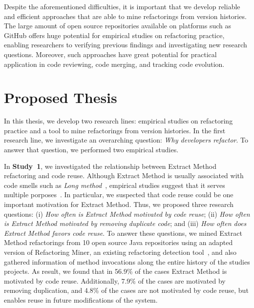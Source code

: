 Despite the aforementioned difficulties, it is important that we develop reliable and efficient approaches that are able to mine refactorings from version histories.
The large amount of open source repositories available on platforms such as GitHub offers huge potential for empirical studies on refactoring practice, enabling researchers to verifying previous findings and investigating new research questions.
Moreover, such approaches have great potential for practical application in code reviewing, code merging, and tracking code evolution.



\section{Proposed Thesis}
\label{ProposedThesis}

In this thesis, we develop two research lines: empirical studies on refactoring practice and a tool to mine refactorings from version histories.
In the first research line, we investigate an overarching question: \emph{Why developers refactor}.
To answer that question, we performed two empirical studies.

In \textbf{Study~1}, we investigated the relationship between Extract Method refactoring and code reuse.
Although Extract Method is usually associated with code smells such as \emph{Long method}~\citep{Fowler:1999}, empirical studies suggest that it serves multiple porposes~\citep{tsantalis_empiricalstudy}.
In particular, we suspected that code reuse could be one important motivation for Extract Method. Thus, we proposed three research questions: (i) \emph{How often is Extract Method motivated by code reuse}; (ii) \emph{How often is Extract Method motivated by removing duplicate code}; and (iii) \emph{How often does Extract Method favors code reuse}.
To answer these questions, we mined Extract Method refactorings from 10 open source Java repositories using an adapted version of Refactoring Miner, an existing refactoring detection tool~\citep{tsantalis_empiricalstudy}, and also gathered information of method invocations along the entire history of the studies projects.
As result, we found that in 56.9\% of the cases Extract Method is motivated by code reuse. Additionally, 7.9\% of the cases are motivated by removing duplication, and 4.8\% of the cases are not motivated by code reuse, but enables reuse in future modifications of the system.

